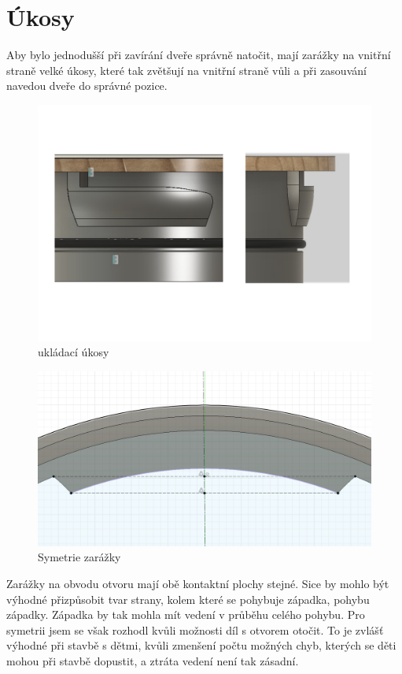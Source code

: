 {\tiny }\section{Úkosy}

    Aby bylo jednodušší při zavírání dveře správně natočit, mají zarážky na vnitřní straně velké úkosy, které tak zvětšují na vnitřní straně 
vůli a při zasouvání navedou dveře do správné pozice.


\begin{figure}[htbp]  
    \centering
    \includegraphics[width=400pt]{kapitoly/obrazky/E4/ukozy/ukladaci_ukosy.pdf}
    \caption{ukládací úkosy}
    \label{fig:E4-ukosy}
\end{figure}

\begin{figure}[htbp]
    \centering
    \includegraphics[width=400pt]{kapitoly/obrazky/E4/ukozy/simetrie_zarazek.png}
    \caption{Symetrie zarážky}
    \label{fig:E4-simetrie_zarazky}
\end{figure}
    Zarážky na obvodu otvoru mají obě kontaktní plochy stejné. Sice by mohlo být výhodné přizpůsobit tvar strany, kolem které se pohybuje západka, 
pohybu západky. Západka by tak mohla mít vedení v průběhu celého pohybu. Pro symetrii jsem se však rozhodl kvůli možnosti díl s otvorem otočit.
To je zvlášť výhodné při stavbě s dětmi, kvůli zmenšení počtu možných chyb, kterých se děti mohou při stavbě dopustit, a ztráta vedení není tak zásadní.


\clearpage
\newpage
